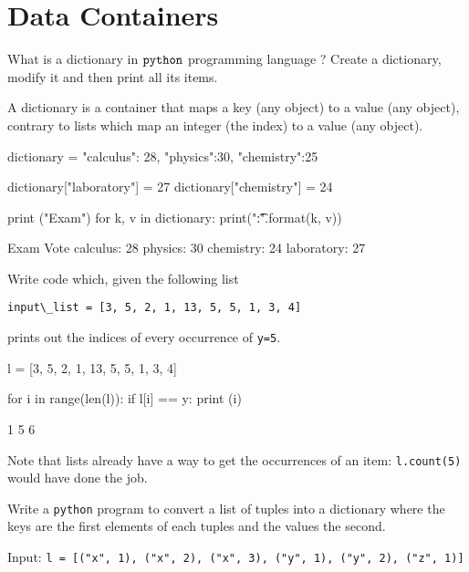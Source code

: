 \chapter{Data Containers}
\label{ex-data-container}

\begin{question}
What is a dictionary in \(\tt{python}\) programming language ? Create a dictionary, modify it and then print all its items.
\end{question}

\begin{solution}
A dictionary is a container that maps a key (any object) to a value (any object), contrary to lists which map an integer (the index) to a value (any object).
\end{solution}

\begin{ipython}
dictionary = {"calculus": 28, "physics":30, "chemistry":25}

dictionary["laboratory"] = 27
dictionary["chemistry"] = 24

print ("Exam\tVote")
for k, v in dictionary:
    print("{}:\t{}".format(k, v))
    
Exam            Vote
calculus:       28
physics:        30
chemistry:      24
laboratory:     27
\end{ipython}

\begin{question}
Write code which, given the following list 

\lstinline[language=iPython]|input\_list = [3, 5, 2, 1, 13, 5, 5, 1, 3, 4]|

\noindent
prints out the indices of every occurrence of \lstinline[language=iPython]|y=5|.
\end{question}

\begin{solution}
\end{solution}

\begin{ipython}
l = [3, 5, 2, 1, 13, 5, 5, 1, 3, 4]

for i in range(len(l)):
    if l[i] == y:
        print (i)

1
5
6
\end{ipython}
Note that lists already have a way to get the occurrences of an item: \texttt{l.count(5)} would have done the job.


\begin{question}
Write a \texttt{python} program to convert a list of tuples into a dictionary where the keys are the first elements of each tuples and the values the second.

\noindent
Input: \lstinline[language=iPython]|l = [("x", 1), ("x", 2), ("x", 3), ("y", 1), ("y", 2), ("z", 1)]|
\end{question}

